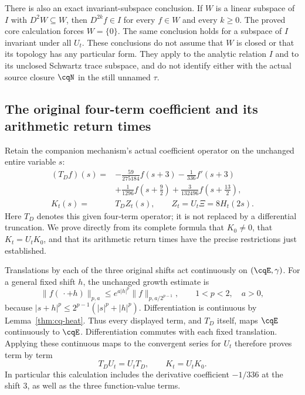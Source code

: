 There is also an exact invariant-subspace conclusion.
If $W$ is a linear subspace of $I$ with $D^2W\subseteq W$,
then $D^{2k}f\in I$ for every $f\in W$ and every $k\geq0$.
The proved core calculation forces $W=\{0\}$.
The same conclusion holds for a subspace of $I$ invariant
under all $U_t$. These conclusions do not assume that $W$
is closed or that its topology has any particular form.
They apply to the analytic relation $I$ and to its unclosed
Schwartz trace subspace, and do not identify either with
the actual source closure $\cqN$ in the still unnamed $\tau$.

\subsection{The original four-term coefficient and its arithmetic return times}
\label{sec:cq-xi4-heat-returns}
Retain the companion mechanism's actual coefficient operator
on the unchanged entire variable $s$:
\begin{equation}\label{eq:cq-xi4-original-operator}
 \begin{aligned}
 (T_Df)(s)={}&-\frac{59}{275184}f(s+3)
             -\frac1{336}f'(s+3)\\
            &+\frac1{1296}f(s+\tfrac92)
             +\frac3{132496}f(s+\tfrac{13}2),\\
 K_t(s)={}&T_DZ_t(s),\qquad Z_t=U_t\Xi=8H_t(2s).
 \end{aligned}
\end{equation}
Here $T_D$ denotes this given four-term operator; it is not
replaced by a differential truncation. We prove directly from
its complete formula that $K_0\ne0$, that $K_t=U_tK_0$,
and that its arithmetic return times have the precise restrictions
just established.

Translations by each of the three original shifts act
continuously on $(\cqE,\gamma)$. For a general fixed shift $h$,
the unchanged growth estimate is
\[
 \|f(\,\cdot+h)\|_{p,a}
 \leq e^{a|h|^p}\|f\|_{p,a/2^{p-1}},
 \qquad 1<p<2,\quad a>0,
\]
because $|s+h|^p\leq2^{p-1}(|s|^p+|h|^p)$.
Differentiation is continuous by Lemma~\ref{thm:cq-heat}.
Thus every displayed term, and $T_D$ itself, maps $\cqE$
continuously to $\cqE$. Differentiation commutes with each
fixed translation. Applying these continuous maps to the
convergent series for $U_t$ therefore proves term by term
\begin{equation}\label{eq:cq-xi4-heat-intertwiner}
 T_DU_t=U_tT_D,\qquad K_t=U_tK_0.
\end{equation}
In particular this calculation includes the derivative coefficient
$-1/336$ at the shift $3$, as well as the three function-value terms.


